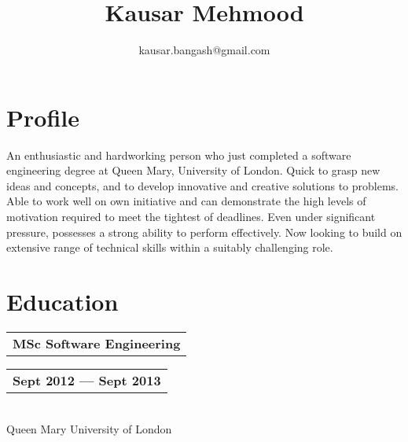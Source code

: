 \documentclass[a4paper]{article}
\title{Kausar Mehmood}
\author{kausar.bangash@gmail.com}
\date{}
\begin{document}
            
            \maketitle
            
            \section*{Profile}
                An enthusiastic and hardworking person who just completed a software engineering degree at Queen Mary, University of London. Quick to grasp new ideas and concepts, and to develop innovative and creative solutions to problems. Able to work well on own initiative and can demonstrate the high levels of motivation required to meet the tightest of deadlines. Even under significant pressure, possesses a strong ability to perform effectively. Now looking to build on extensive range of technical skills within a suitably challenging role.
            
            
            
            \section*{Education}
                
                \begin{tabular}[t]{@{}l} 
                    \textbf{MSc Software Engineering}
                \end{tabular}
                \hfill
                \begin{tabular}[t]{l@{}}
                    \textbf{Sept 2012 --- Sept 2013}
                \end{tabular}\\
                Queen Mary University of London
        
\end{document}
